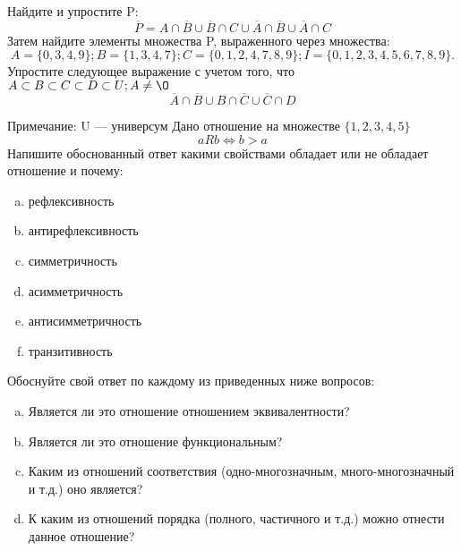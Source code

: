 \documentclass[10pt]{exam}
\begin{document}
\begin{questions}
\question
Найдите и упростите P:
\begin{equation*}
\overline{P} = A \cap \overline{B} \cup \overline{B} \cap C \cup \overline{A} \cap \overline{B} \cup \overline{A} \cap C
\end{equation*}
Затем найдите элементы множества P, выраженного через множества:
\begin{equation*}
A = \{0, 3, 4, 9\}; 
B = \{1, 3, 4, 7\};
C = \{0, 1, 2, 4, 7, 8, 9\};
I = \{0, 1, 2, 3, 4, 5, 6, 7, 8, 9\}.
\end{equation*}\question
Упростите следующее выражение с учетом того, что $A\subset B \subset C \subset D \subset U; A \neq \O$
\begin{equation*}
\overline{A} \cap \overline{B} \cup B \cap \overline{C} \cup \overline{C} \cap D
\end{equation*}

Примечание: U — универсум\question
Дано отношение на множестве $\{1, 2, 3, 4, 5\}$ 
\begin{equation*}
aRb \iff b > a
\end{equation*}
Напишите обоснованный ответ какими свойствами обладает или не обладает отношение и почему:   
\begin{enumerate} [a)]\setcounter{enumi}{0}
\item рефлексивность
\item антирефлексивность
\item симметричность
\item асимметричность
\item антисимметричность
\item транзитивность
\end{enumerate}

Обоснуйте свой ответ по каждому из приведенных ниже вопросов:
\begin{enumerate} [a)]\setcounter{enumi}{0}
    \item Является ли это отношение отношением эквивалентности?
    \item Является ли это отношение функциональным?
    \item Каким из отношений соответствия (одно-многозначным, много-многозначный и т.д.) оно является?
    \item К каким из отношений порядка (полного, частичного и т.д.) можно отнести данное отношение?
\end{enumerate}


\end{questions}
\end{document}
